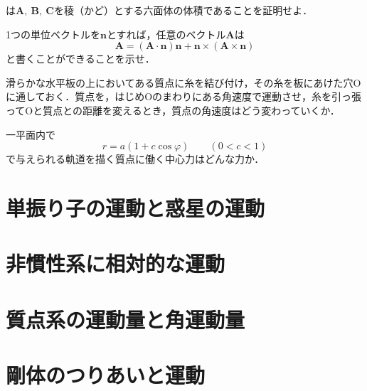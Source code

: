 \begin{enumerate}[label=\textbf{[\arabic*]}, labelsep=10pt, leftmargin=23pt]
\begin{equation*}
		\end{equation*}
		は$\bm{A},\ \bm{B},\ \bm{C}$を稜（かど）とする六面体の体積であることを証明せよ．
	\item 1つの単位ベクトルを$\bm{n}$とすれば，任意のベクトル$\bm{A}$は
		\begin{equation*}
			\bm{A} = (\bm{A} \cdot \bm{n})\bm{n} + \bm{n} \times (\bm{A} \times \bm{n})
		\end{equation*}
		と書くことができることを示せ．
	\item 滑らかな水平板の上においてある質点に糸を結び付け，その糸を板にあけた穴$\mathrm{O}$に通しておく．質点を，はじめOのまわりにある角速度で運動させ，糸を引っ張ってOと質点との距離を変えるとき，質点の角速度はどう変わっていくか．
	\item 一平面内で
		\begin{equation*}
			r = a(1 + c\cos \varphi)\qquad (0 < c < 1)
		\end{equation*}
		で与えられる軌道を描く質点に働く中心力はどんな力か．
\end{enumerate}



\section{単振り子の運動と惑星の運動}



\section{非慣性系に相対的な運動}



\section{質点系の運動量と角運動量}



\section{剛体のつりあいと運動}